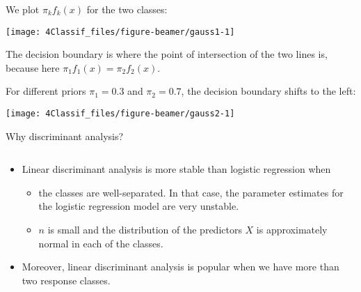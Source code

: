 \documentclass[10pt,ignorenonframetext,]{beamer}
\providecommand{\tightlist}{%
  \setlength{\itemsep}{0pt}\setlength{\parskip}{0pt}}
\begin{document}
\begin{frame}

We plot \(\pi_k f_k(x)\) for the two classes:

\begin{center}\texttt{[image: 4Classif\_files/figure-beamer/gauss1-1]} \end{center}

The decision boundary is where the point of intersection of the two
lines is, because here \(\pi_1 f_1(x)=\pi_2 f_2(x)\).

\end{frame}

\begin{frame}

For different priors \(\pi_1 = 0.3\) and \(\pi_2 = 0.7\), the decision
boundary shifts to the left:

\begin{center}\texttt{[image: 4Classif\_files/figure-beamer/gauss2-1]} \end{center}

\end{frame}

\begin{frame}

\begin{block}{Why discriminant analysis?}

\(~\)

\begin{itemize}
\item
  Linear discriminant analysis is more stable than logistic regression
  when

  \begin{itemize}
  \tightlist
  \item
    the classes are well-separated. In that case, the parameter
    estimates for the logistic regression model are very unstable.
  \item
    \(n\) is small and the distribution of the predictors \(X\) is
    approximately normal in each of the classes.
  \end{itemize}
\end{itemize}

\vspace{4mm}

\begin{itemize}
\tightlist
\item
  Moreover, linear discriminant analysis is popular when we have more
  than two response classes.
\end{itemize}

\end{block}

\end{frame}
\end{document}
